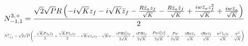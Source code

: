 \documentclass[10pt]{article}
\begin{document}
\begin{equation*}
\resizebox{0.98\textwidth}{!}{${\displaystyle N^{3,+}_{-1,1}=\frac{\sqrt{2} \sqrt{P} R \left(- i \sqrt{K} z_f - i \sqrt{K} \bar z_f - \frac{R \bar z_a z_f}{\sqrt{K}} - \frac{R \bar z_a \bar z_f}{\sqrt{K}} + \frac{i w \bar z_a z_f^{2}}{\sqrt{K}} + \frac{i w \bar z_a}{\sqrt{K}}\right)}{2}}$}
\end{equation*}
\begin{equation*}
\resizebox{0.98\textwidth}{!}{${\displaystyle N^{3,-}_{-1,1}=\sqrt{2} \sqrt{P} \left(- \frac{\sqrt{K} P z_a \bar z_f}{2} + \frac{\sqrt{K} P \bar z_a z_f}{2} - \sqrt{K} w \bar z_a z_f - \sqrt{K} w - \frac{i P R \bar z_a^{2} z_f}{2 \sqrt{K}} + \frac{i P R \bar z_f}{2 \sqrt{K}} - \frac{P w \bar z_a^{2} z_f^{2}}{2 \sqrt{K}} + \frac{P w}{2 \sqrt{K}} - \frac{i R w \bar z_a}{\sqrt{K}} - \frac{i R w \bar z_f}{\sqrt{K}} - \frac{w^{2} \bar z_a z_f}{\sqrt{K}} - \frac{w^{2}}{\sqrt{K}}\right)}$}
\end{equation*}
\end{document}
